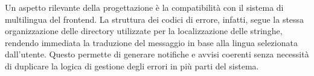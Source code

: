 Un aspetto rilevante della progettazione è la compatibilità con il sistema di multilingua del frontend. La struttura dei codici di errore, infatti, segue la stessa organizzazione delle directory utilizzate per la localizzazione delle stringhe, rendendo immediata la traduzione del messaggio in base alla lingua selezionata dall'utente. Questo permette di generare notifiche e avvisi coerenti senza necessità di duplicare la logica di gestione degli errori in più parti del sistema.

